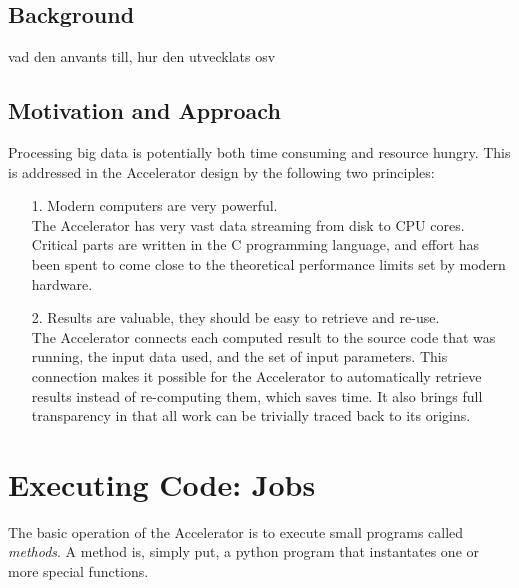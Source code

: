 \documentclass[a4paper]{article}
\begin{document}
\subsection*{Background}
vad den anvants till, hur den utvecklats osv

\subsection*{Motivation and Approach}
Processing big data is potentially both time consuming and resource
hungry.  This is addressed in the Accelerator design by the following
two principles:
\begin{itemize}
\item[1.] Modern computers are very powerful.\\ The Accelerator has
  very vast data streaming from disk to CPU cores.  Critical parts are
  written in the C programming language, and effort has been spent to
  come close to the theoretical performance limits set by modern
  hardware.
  
\item[2.] Results are valuable, they should be easy to retrieve and
  re-use.\\ The Accelerator connects each computed result to the
  source code that was running, the input data used, and the set of
  input parameters.  This connection makes it possible for the
  Accelerator to automatically retrieve results instead of
  re-computing them, which saves time.  It also brings full
  transparency in that all work can be trivially traced back to its
  origins.
\end{itemize}



















\clearpage
\section{Executing Code: Jobs}
The basic operation of the Accelerator is to execute small programs
called \textsl{methods}.  A method is, simply put, a python program
that instantates one or more special functions.
\end{document}
